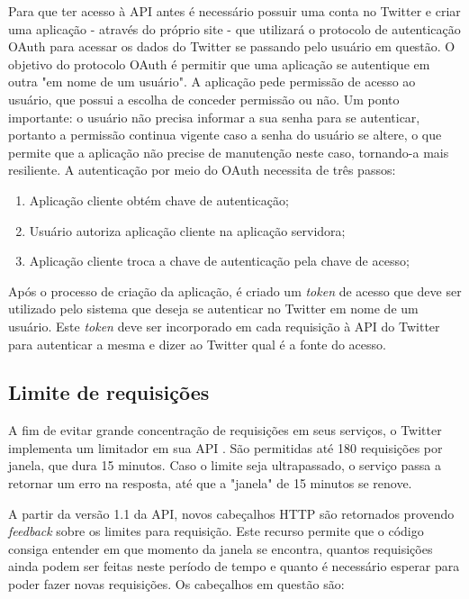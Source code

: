 Para que ter acesso à API antes é necessário possuir uma conta no Twitter e criar uma aplicação - através do próprio site \cite{twitterapp} - que utilizará o protocolo de autenticação OAuth\cite{oauth} para acessar os dados do Twitter se passando pelo usuário em questão. O objetivo do protocolo OAuth é permitir que uma aplicação se autentique em outra "em nome de um usuário". A aplicação pede permissão de acesso ao usuário, que possui a escolha de conceder permissão ou não. Um ponto importante: o usuário não precisa informar a sua senha para se autenticar, portanto a permissão continua vigente caso a senha do usuário se altere, o que permite que a aplicação não precise de manutenção neste caso, tornando-a mais resiliente. A autenticação por meio do OAuth necessita de três passos:

\begin{enumerate}
	\item Aplicação cliente obtém chave de autenticação;
	\item Usuário autoriza aplicação cliente na aplicação servidora;
	\item Aplicação cliente troca a chave de autenticação pela chave de acesso;
\end{enumerate}

Após o processo de criação da aplicação, é criado um \textit{token} de acesso que deve ser utilizado pelo sistema que deseja se autenticar no Twitter em nome de um usuário. Este \textit{token} deve ser incorporado em cada requisição à API do Twitter para autenticar a mesma e dizer ao Twitter qual é a fonte do acesso.

\subsection{Limite de requisições}
A fim de evitar grande concentração de requisições em seus serviços, o Twitter implementa um limitador em sua API \cite{twitterrequestlimit2016}. São permitidas até 180 requisições por janela, que dura 15 minutos. Caso o limite seja ultrapassado, o serviço passa a retornar um erro na resposta, até que a "janela" de 15 minutos se renove.

A partir da versão 1.1 da API, novos cabeçalhos \ac{HTTP} são retornados provendo \textit{feedback} sobre os limites para requisição. Este recurso permite que o código consiga entender em que momento da janela se encontra, quantos requisições ainda podem ser feitas neste período de tempo e quanto é necessário esperar para poder fazer novas requisições. Os cabeçalhos em questão são:

